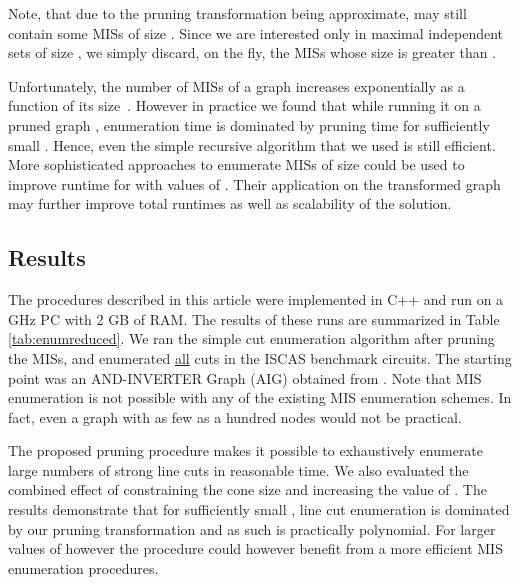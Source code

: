 \documentclass[journal]{IEEEtran}
\begin{document}
Note, that due to the pruning transformation being approximate,  may still contain some MISs of size . Since we are interested only in maximal independent sets of size , we simply discard, on the fly, the MISs whose size is greater than .

Unfortunately, the number of MISs of a graph increases exponentially as a function of its size~\cite{moon1965cliques}. However in practice  we found that while running it on a pruned graph , enumeration time is dominated by pruning time for sufficiently small .  Hence, even the simple recursive algorithm that we used is still efficient. More sophisticated approaches to enumerate MISs of size  \cite{byskov2003algorithms,eppstein2001small} could be used to improve runtime for with values of . Their application on the transformed graph may further improve total runtimes as well as scalability of the solution.

\subsection{Results}

The procedures described in this article were implemented in C++ and run on a GHz PC with 2 GB of RAM.  The results of these runs are summarized in Table \ref{tab:enumreduced}. We ran the simple cut enumeration algorithm after pruning the MISs, and enumerated \underline{all} cuts in the  ISCAS benchmark circuits. The starting point was an AND-INVERTER Graph (AIG) obtained from \cite{Mishchenko2007}. Note that MIS enumeration is not possible with any of the existing MIS enumeration schemes.  In fact, even a graph with as few as a hundred nodes would not be practical.  

The proposed pruning procedure makes it possible to exhaustively enumerate large numbers of strong line cuts in reasonable time. We also evaluated the combined effect of constraining the cone size and increasing the value of .  The results demonstrate that for sufficiently small , line cut enumeration is dominated by our pruning transformation and as such is practically polynomial. For larger values of  however the procedure could however benefit from a more efficient MIS enumeration procedures. 
\end{document}
